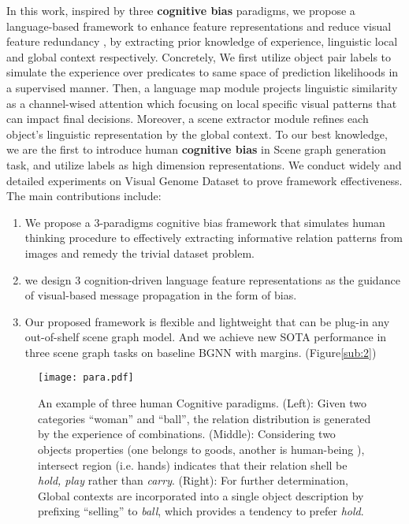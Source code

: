 \documentclass[runningheads]{llncs}
\begin{document}
In this work, inspired by three \textbf{cognitive bias} paradigms, we propose a
language-based framework to enhance feature representations and reduce visual
feature redundancy , by extracting  prior knowledge of experience, linguistic
local and global context respectively.	Concretely,  We first utilize object
pair labels to simulate the experience over predicates to same space of
prediction likelihoods in a supervised manner. Then, a language map module
projects linguistic similarity as a channel-wised attention which focusing on
local specific visual patterns that can impact final decisions. Moreover, a
scene extractor module refines each object’s linguistic representation by the
global context.   To our best knowledge, we are the first to introduce human
\textbf{cognitive bias} in Scene graph generation task, and utilize labels as
high dimension representations. We conduct widely and detailed experiments on
Visual Genome Dataset to prove framework effectiveness. The main contributions
include:
\begin{enumerate}
  \item We propose a 3-paradigms cognitive bias framework that	simulates human
        thinking procedure to effectively  extracting informative relation patterns
        from images and remedy the trivial dataset problem.
  \item we design 3 cognition-driven language feature representations as the
        guidance of visual-based message propagation in  the form of bias.
  \item Our proposed framework is flexible and lightweight that can be plug-in
        any out-of-shelf scene graph model. And we achieve new SOTA performance in
        three scene graph tasks on baseline BGNN\cite{bgnn} with margins.
        (Figure\ref{sub:2})

\end{enumerate}
\begin{figure}[t!]
  \centering
  {
    \texttt{[image: para.pdf]}
  }

  \caption{An example of three human Cognitive paradigms. (Left): Given two
    categories ``woman'' and ``ball'', the relation distribution is generated by
    the experience of combinations. (Middle): Considering two objects properties
    (one belongs to goods, another is human-being ), intersect region (i.e. hands)
    indicates that their relation shell be	\textit{hold, play} rather than
    \textit{carry}. (Right): For further determination, Global contexts are
    incorporated into a single object description by prefixing ``selling'' to
    \textit{ball}, which provides a tendency to prefer \textit{hold}.}
  \label{fig:para}

\end{figure}
\end{document}
